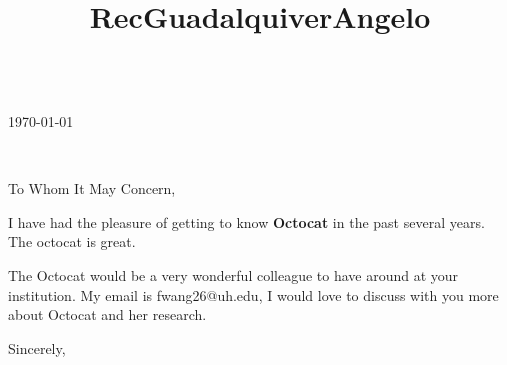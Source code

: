 \documentclass[11pt,a4paper]{letter} %
\title{RecGuadalquiverAngelo}
\def\opening#1{\thispagestyle{empty}
{\centering\fromaddress \vspace{0.6in} \\ %
\hspace*{\longindentation}\today\hspace*{\fill}\par} %
{\raggedright \toname \\ \toaddress \par} %
\vspace{0.4in} %
\noindent #1 %
}
\begin{document}

\begin{letter}{\hspace{1cm}}


\opening{To Whom It May Concern,}

\begin{spacing}{1.025}
I have had the pleasure of getting to know {\bf Octocat} in the past several years. The octocat is great.

\lipsum[1-11]

The Octocat would be a very wonderful colleague to have around at your institution. My email is fwang26@uh.edu, I would love to discuss with you more about Octocat and her research.
\end{spacing}

\closing{Sincerely,}


\end{letter}
\end{document}
